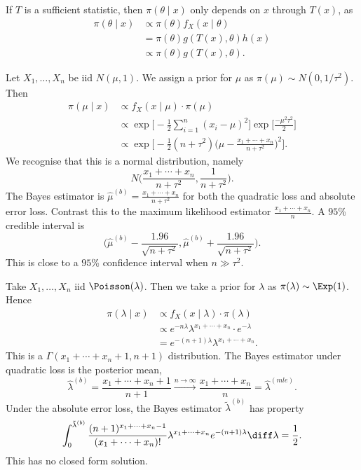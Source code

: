 \documentclass[12pt]{article}
\begin{document}
If $T$ is a sufficient statistic, then $\pi(\theta \mid x)$ only depends on $x$ through $T(x)$, as
\begin{align*}
	\pi(\theta \mid x) &\propto \pi(\theta) f_X(x \mid \theta) \\
			   &= \pi(\theta) g(T(x), \theta) h(x) \\
			   &\propto \pi(\theta) g(T(x), \theta).
\end{align*}

\begin{exbox}
	Let $X_1, \ldots, X_n$ be iid $N(\mu, 1)$. We assign a prior for $\mu$ as $\pi(\mu) \sim N(0,1/\tau^2)$. Then
	\begin{align*}
		\pi(\mu \mid x) &\propto f_X(x\mid \mu) \cdot \pi(\mu) \\
				&\propto \exp \Biggl[ -\frac{1}{2} \sum_{i=1}^{n} (x_i - \mu)^2 \Biggr] \exp \Biggl[ \frac{- \mu^2 \tau^2}{2} \Biggr] \\
				&\propto \exp \Biggl[ -\frac{1}{2} (n + \tau^2) \biggl( \mu - \frac{x_1 + \cdots + x_n}{n + \tau^2} \biggr)^2 \Biggr].
	\end{align*}
	We recognise that this is a normal distribution, namely
	\[
	N \biggl( \frac{x_1 + \cdots + x_n}{n + \tau^2}, \frac{1}{n + \tau^2} \biggr)
	.\]
	The Bayes estimator is $\hat \mu^{(b)} = \frac{x_1 + \cdots + x_n}{n + \tau^2}$ for both the quadratic loss and absolute error loss. Contrast this to the maximum likelihood estimator $\frac{x_1 + \cdots + x_n}{n}$.
	A $95$\% credible interval is
	\[
		\biggl( \hat \mu^{(b)} - \frac{1.96}{\sqrt{n + \tau^2}}, \hat \mu^{(b)} + \frac{1.96}{\sqrt{n+\tau^2}} \biggr)
	.\]
	This is close to a $95$\% confidence interval when $n \gg \tau^2$.
\end{exbox}

\begin{exbox}
	Take $X_1, \ldots, X_n$ iid $\Poisson(\lambda)$. Then we take a prior for $\lambda$ as $\pi(\lambda) \sim \Exp(1)$. Hence
	\begin{align*}
		\pi(\lambda \mid x) &\propto f_X(x \mid \lambda) \cdot \pi(\lambda) \\
				    &\propto e^{-n \lambda} \lambda^{x_1 + \cdots + x_n} \cdot e^{-\lambda} \\
				    &= e^{-(n+1)\lambda} \lambda^{x_1 + \cdots + x_n}.
	\end{align*}
	This is a $\Gamma(x_1 + \cdots + x_n + 1, n +1)$ distribution. The Bayes estimator under quadratic loss is the posterior mean,
	\[
		\hat \lambda^{(b)} = \frac{x_1 + \cdots + x_n + 1}{n + 1} \overset{n \to \infty}{\to} \frac{x_1 + \cdots + x_n}{n} = \hat \lambda^{(mle)}
	.\]
	Under the absolute error loss, the Bayes estimator $\tilde \lambda^{(b)}$ has property
	\[
	\int_{0}^{\tilde \lambda^{(b)}} \frac{(n+1)^{x_1 + \cdots + x_n - 1}}{(x_1 + \cdots + x_n)!} \lambda^{x_1 + \cdots + x_n} e^{-(n+1)\lambda} \diff \lambda = \frac{1}{2}
	.\]
	This has no closed form solution.
\end{exbox}
\end{document}
